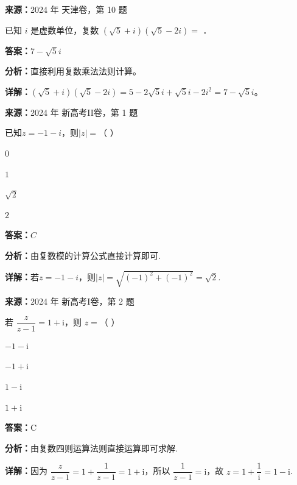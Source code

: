 \begin{question}[points=5]
\textbf{来源：}2024 年 天津卷，第 10 题\par
已知 $i$ 是虚数单位，复数 $(\sqrt{5}+i)(\sqrt{5}-2i)=$ ．
\fillin[{$7-\sqrt{5}i$}]
\begin{solution}
\textbf{答案：}$7-\sqrt{5}i$

\textbf{分析：}直接利用复数乘法法则计算。

\textbf{详解：}$(\sqrt{5}+i)(\sqrt{5}-2i)=5-2\sqrt{5}i+\sqrt{5}i-2i^2=7-\sqrt{5}i$。
\end{solution}
\end{question}

\begin{question}[points=5]
\textbf{来源：}2024 年 新高考II卷，第 1 题\par
已知$z = -1 - i$，则$|z| =$（ ）
\begin{choices}
  \item $0$
  \item $1$
  \item $\sqrt{2}$
  \item $2$
\end{choices}
\begin{solution}
\textbf{答案：}$C$

\textbf{分析：}由复数模的计算公式直接计算即可.

\textbf{详解：}若$z = -1 - i$，则$|z| = \sqrt{(-1)^2 + (-1)^2} = \sqrt{2}$.
\end{solution}
\end{question}

\begin{question}[points=5]
\textbf{来源：}2024 年 新高考I卷，第 2 题\par
若 $\dfrac{z}{z-1}=1+\mathrm{i}$，则 $z=$（ ）
\begin{choices}
  \item $-1-\mathrm{i}$
  \item $-1+\mathrm{i}$
  \item $1-\mathrm{i}$
  \item $1+\mathrm{i}$
\end{choices}
\begin{solution}
\textbf{答案：}C

\textbf{分析：}由复数四则运算法则直接运算即可求解.

\textbf{详解：}因为 $\dfrac{z}{z-1}=1+\dfrac{1}{z-1}=1+\mathrm{i}$，所以 $\dfrac{1}{z-1}=\mathrm{i}$，故 $z=1+\dfrac{1}{\mathrm{i}}=1-\mathrm{i}$.
\end{solution}
\end{question}

